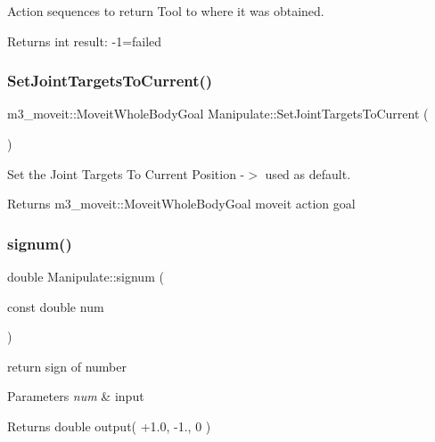 Action sequences to return Tool to where it was obtained. 

\begin{DoxyReturn}{Returns}
int result\+: -\/1=failed 
\end{DoxyReturn}
\mbox{\label{structManipulate_a1c91c2b91d2012652f62071e45899a21}} 
\subsubsection{\texorpdfstring{Set\+Joint\+Targets\+To\+Current()}{SetJointTargetsToCurrent()}}
{\footnotesize\ttfamily m3\+\_\+moveit\+::\+Moveit\+Whole\+Body\+Goal Manipulate\+::\+Set\+Joint\+Targets\+To\+Current (\begin{DoxyParamCaption}{ }\end{DoxyParamCaption})\hspace{0.3cm}{\ttfamily [private]}}



Set the Joint Targets To Current Position -\/$>$ used as default. 

\begin{DoxyReturn}{Returns}
m3\+\_\+moveit\+::\+Moveit\+Whole\+Body\+Goal moveit action goal 
\end{DoxyReturn}
\mbox{\label{structManipulate_a423d2c284a0ecab7089b36908e5e871a}} 
\subsubsection{\texorpdfstring{signum()}{signum()}}
{\footnotesize\ttfamily double Manipulate\+::signum (\begin{DoxyParamCaption}\item[{const double}]{num }\end{DoxyParamCaption})\hspace{0.3cm}{\ttfamily [private]}}



return sign of number 


\begin{DoxyParams}{Parameters}
{\em num} & input \\
\hline
\end{DoxyParams}
\begin{DoxyReturn}{Returns}
double output( +1.0, -\/1., 0 ) 
\end{DoxyReturn}
\mbox{\label{structManipulate_a6d5bd85cd1be15a91afc75877718de08}} 
